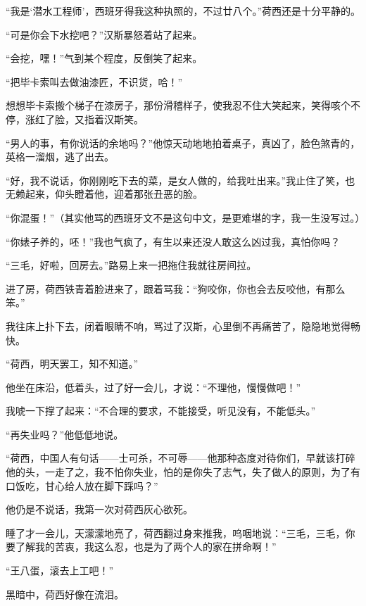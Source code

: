 \par “我是‘潜水工程师’，西班牙得我这种执照的，不过廿八个。”荷西还是十分平静的。
\par “可是你会下水挖吧？”汉斯暴怒着站了起来。
\par “会挖，嘿！”气到某个程度，反倒笑了起来。
\par “把毕卡索叫去做油漆匠，不识货，哈！”
\par 想想毕卡索搬个梯子在漆房子，那份滑稽样子，使我忍不住大笑起来，笑得咳个不停，涨红了脸，又指着汉斯笑。
\par “男人的事，有你说话的余地吗？”他惊天动地地拍着桌子，真凶了，脸色煞青的，英格一溜烟，逃了出去。
\par “好，我不说话，你刚刚吃下去的菜，是女人做的，给我吐出来。”我止住了笑，也无赖起来，仰头瞪着他，迎着那张丑恶的脸。
\par “你混蛋！”（其实他骂的西班牙文不是这句中文，是更难堪的字，我一生没写过。）
\par “你婊子养的，呸！”我也气疯了，有生以来还没人敢这么凶过我，真怕你吗？
\par “三毛，好啦，回房去。”路易上来一把拖住我就往房间拉。
\par 进了房，荷西铁青着脸进来了，跟着骂我：“狗咬你，你也会去反咬他，有那么笨。”
\par 我往床上扑下去，闭着眼睛不响，骂过了汉斯，心里倒不再痛苦了，隐隐地觉得畅快。
\par “荷西，明天罢工，知不知道。”
\par 他坐在床沿，低着头，过了好一会儿，才说：“不理他，慢慢做吧！”
\par 我唬一下撑了起来：“不合理的要求，不能接受，听见没有，不能低头。”
\par “再失业吗？”他低低地说。
\par “荷西，中国人有句话——士可杀，不可辱——他那种态度对待你们，早就该打碎他的头，一走了之，我不怕你失业，怕的是你失了志气，失了做人的原则，为了有口饭吃，甘心给人放在脚下踩吗？”
\par 他仍是不说话，我第一次对荷西灰心欲死。
\par 睡了才一会儿，天濛濛地亮了，荷西翻过身来推我，呜咽地说：“三毛，三毛，你要了解我的苦衷，我这么忍，也是为了两个人的家在拼命啊！”
\par “王八蛋，滚去上工吧！”
\par 黑暗中，荷西好像在流泪。



